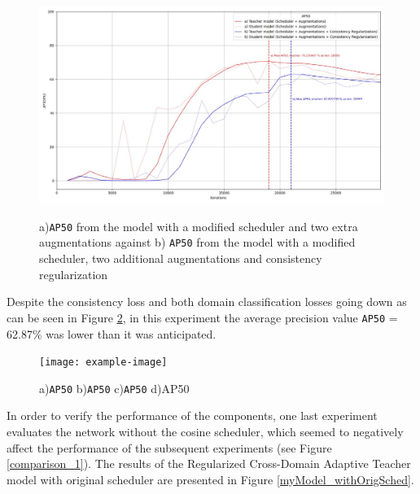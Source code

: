 \documentclass[english, 12pt, a4paper, elec, utf8, a-1b, online]{aaltothesis}
\begin{document}
\begin{figure}[htb]
	\begin{center}
		\includegraphics[width=14cm]{./AP50_Augm_consistency.jpg}
	\end{center}
	\caption{a)\texttt{AP50} from the model with a modified scheduler and two extra augmentations against b) \texttt{AP50} from the model with a modified scheduler, two additional augmentations and consistency regularization}
	\begin{center}
		\label{myModel_experiment}
	\end{center}
\end{figure}
\FloatBarrier  

Despite the consistency loss and both domain classification losses going down as can be seen in Figure \ref{myModel_constloss}, in this experiment the average precision value \texttt{AP50} = 62.87\%  was lower than it was anticipated. 

\begin{figure}[htb]
	\begin{center}
		\texttt{[image: example-image]}
	\end{center}
	\caption{a)\texttt{AP50} b)\texttt{AP50} c)\texttt{AP50} d)AP50}
	\begin{center}
		\label{myModel_constloss}
	\end{center}
\end{figure}
\FloatBarrier  

In order to verify the performance of the components, one last experiment evaluates the network without the cosine scheduler, which seemed to negatively affect the performance of the subsequent experiments (see Figure \ref{comparison_1}). The results of the Regularized Cross-Domain Adaptive Teacher model with original scheduler are presented in Figure \ref{myModel_withOrigSched}.
\end{document}
